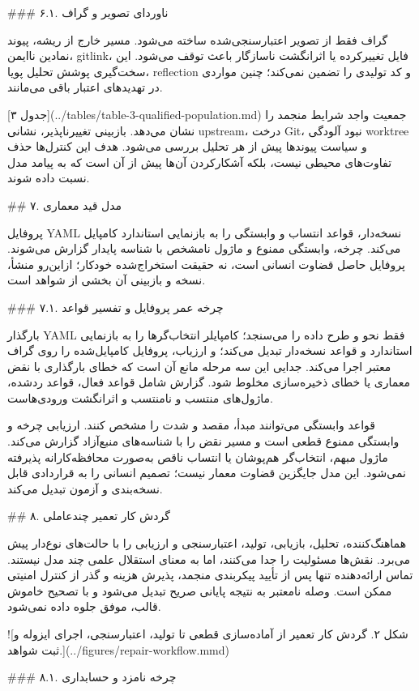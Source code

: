 \documentclass[11pt,a4paper]{article}
\begin{document}
\#\#\# ۶.۱. ناوردای تصویر و گراف

گراف فقط از تصویر اعتبارسنجی‌شده ساخته می‌شود. مسیر خارج از ریشه، پیوند نمادین ناایمن، gitlink، فایل
تغییرکرده یا اثرانگشت ناسازگار باعث توقف می‌شود. این سخت‌گیری پوشش تحلیل پویا، reflection و کد تولیدی
را تضمین نمی‌کند؛ چنین مواردی در تهدیدهای اعتبار باقی می‌مانند.

[جدول ۳](../tables/table-3-qualified-population.md) جمعیت واجد شرایط منجمد را نشان می‌دهد. بازبینی
تغییرناپذیر، نشانی upstream، درخت Git، نبود آلودگی worktree و سیاست پیوندها پیش از هر تحلیل بررسی
می‌شود. هدف این کنترل‌ها حذف تفاوت‌های محیطی نیست، بلکه آشکارکردن آن‌ها پیش از آن است که به پیامد مدل
نسبت داده شوند.

\#\# ۷. مدل قید معماری

پروفایل YAML نسخه‌دار، قواعد انتساب و وابستگی را به بازنمایی استاندارد کامپایل می‌کند. چرخه، وابستگی
ممنوع و ماژول نامشخص با شناسه پایدار گزارش می‌شوند. پروفایل حاصل قضاوت انسانی است، نه حقیقت استخراج‌شده
خودکار؛ ازاین‌رو منشأ، نسخه و بازبینی آن بخشی از شواهد است.

\#\#\# ۷.۱. چرخه عمر پروفایل و تفسیر قواعد

بارگذار YAML فقط نحو و طرح داده را می‌سنجد؛ کامپایلر انتخاب‌گرها را به بازنمایی استاندارد و قواعد
نسخه‌دار تبدیل می‌کند؛ و ارزیاب، پروفایل کامپایل‌شده را روی گراف معتبر اجرا می‌کند. جدایی این سه مرحله
مانع آن است که خطای بارگذاری با نقض معماری یا خطای ذخیره‌سازی مخلوط شود. گزارش شامل قواعد فعال، قواعد
ردشده، ماژول‌های منتسب و نامنتسب و اثرانگشت ورودی‌هاست.

قواعد وابستگی می‌توانند مبدأ، مقصد و شدت را مشخص کنند. ارزیابی چرخه و وابستگی ممنوع قطعی است و مسیر
نقض را با شناسه‌های منبع‌آزاد گزارش می‌کند. ماژول مبهم، انتخاب‌گر هم‌پوشان یا انتساب ناقص به‌صورت
محافظه‌کارانه پذیرفته نمی‌شود. این مدل جایگزین قضاوت معمار نیست؛ تصمیم انسانی را به قراردادی قابل
نسخه‌بندی و آزمون تبدیل می‌کند.

\#\# ۸. گردش کار تعمیر چندعاملی

هماهنگ‌کننده، تحلیل، بازیابی، تولید، اعتبارسنجی و ارزیابی را با حالت‌های نوع‌دار پیش می‌برد. نقش‌ها
مسئولیت را جدا می‌کنند، اما به معنای استقلال علمی چند مدل نیستند. تماس ارائه‌دهنده تنها پس از تأیید
پیکربندی منجمد، پذیرش هزینه و گذر از کنترل امنیتی ممکن است. وصله نامعتبر به نتیجه پایانی صریح تبدیل
می‌شود و با تصحیح خاموش قالب، موفق جلوه داده نمی‌شود.

![شکل ۲. گردش کار تعمیر از آماده‌سازی قطعی تا تولید، اعتبارسنجی، اجرای ایزوله و ثبت شواهد.](../figures/repair-workflow.mmd)

\#\#\# ۸.۱. چرخه نامزد و حسابداری
\end{document}
